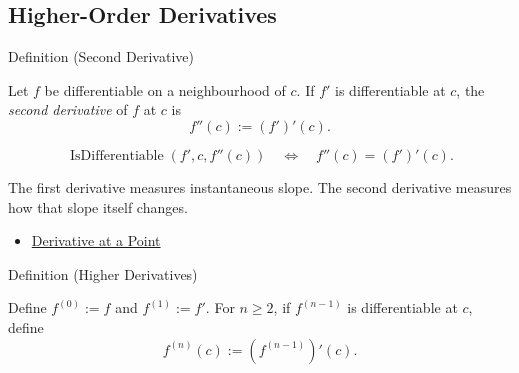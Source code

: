 \subsection{Higher-Order Derivatives}

\begin{definitionbox}{Definition (Second Derivative)}
\begin{definition}
\label{def:second-derivative}
Let $f$ be differentiable on a neighbourhood of $c$. If $f'$ is differentiable at $c$, the \emph{second derivative} of $f$ at $c$ is
\[
  f''(c):=(f')'(c).
\]
\end{definition}
\end{definitionbox}

\begin{remark*}
\[
  \operatorname{IsDifferentiable}(f',c,f''(c))
  \quad\Longleftrightarrow\quad
  f''(c)=(f')'(c).
\]
\end{remark*}

\begin{remark*}[Interpretation]
The first derivative measures instantaneous slope. The second derivative measures how that slope itself changes.
\end{remark*}

\begin{dependencies}
\begin{itemize}
  \item \hyperref[def:derivative-at-a-point]{Derivative at a Point}
\end{itemize}
\end{dependencies}

\begin{definitionbox}{Definition (Higher Derivatives)}
\begin{definition}
\label{def:higher-derivatives}
Define $f^{(0)}:=f$ and $f^{(1)}:=f'$. For $n\geq 2$, if $f^{(n-1)}$ is differentiable at $c$, define
\[
  f^{(n)}(c):=(f^{(n-1)})'(c).
\]
\end{definition}
\end{definitionbox}

